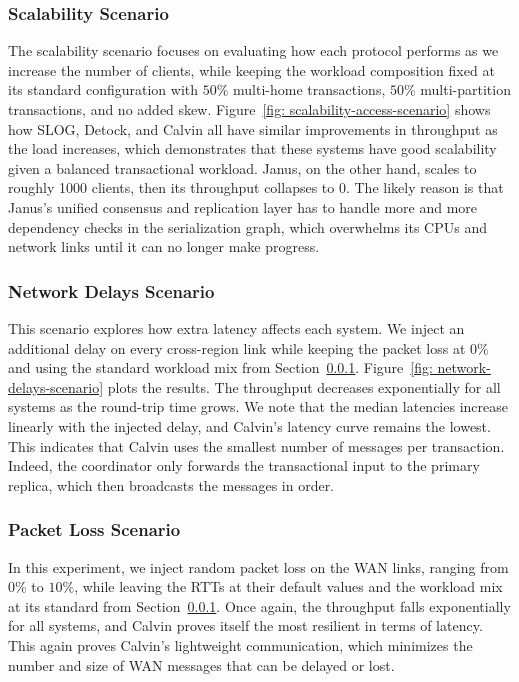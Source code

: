 \documentclass{article}
\begin{document}
\subsubsection{Scalability Scenario}
\label{subsubsec: scalability-scenario}
The scalability scenario focuses on evaluating how each protocol performs as we increase the number of clients, while keeping the workload composition fixed at its standard configuration with $50\%$ multi-home transactions, $50\%$ multi-partition transactions, and no added skew. Figure~\ref{fig: scalability-access-scenario} shows how SLOG, Detock, and Calvin all have similar improvements in throughput as the load increases, which demonstrates that these systems have good scalability given a balanced transactional workload. Janus, on the other hand, scales to roughly 1000 clients, then its throughput collapses to 0. The likely reason is that Janus's unified consensus and replication layer has to handle more and more dependency checks in the serialization graph, which overwhelms its CPUs and network links until it can no longer make progress.

\subsubsection{Network Delays Scenario}
\label{subsubsec: network-delays-scenario}
This scenario explores how extra latency affects each system. We inject an additional delay on every cross-region link while keeping the packet loss at $0\%$ and using the standard workload mix from Section~\ref{subsubsec: scalability-scenario}. Figure~\ref{fig: network-delays-scenario} plots the results. The throughput decreases exponentially for all systems as the round-trip time grows. We note that the median latencies increase linearly with the injected delay, and Calvin's latency curve remains the lowest. This indicates that Calvin uses the smallest number of messages per transaction. Indeed, the coordinator only forwards the transactional input to the primary replica, which then broadcasts the messages in order. 

\subsubsection{Packet Loss Scenario}
\label{subsubsec: packet-loss-scenario}
In this experiment, we inject random packet loss on the WAN links, ranging from $0\%$ to $10\%$, while leaving the RTTs at their default values and the workload mix at its standard from Section~\ref{subsubsec: scalability-scenario}. Once again, the throughput falls exponentially for all systems, and Calvin proves itself the most resilient in terms of latency. This again proves Calvin's lightweight communication, which minimizes the number and size of WAN messages that can be delayed or lost.
\end{document}
